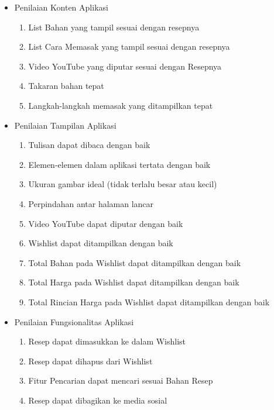 		\begin{itemize}
			\item Penilaian Konten Aplikasi
			\begin{enumerate}
				\item List Bahan yang tampil sesuai dengan resepnya
				\item List Cara Memasak yang tampil sesuai dengan resepnya
				\item Video YouTube yang diputar sesuai dengan Resepnya
				\item Takaran bahan tepat
				\item Langkah-langkah memasak yang ditampilkan tepat
			\end{enumerate}
			\item Penilaian Tampilan Aplikasi
			\begin{enumerate}
				\item Tulisan dapat dibaca dengan baik
				\item Elemen-elemen dalam aplikasi tertata dengan baik
				\item Ukuran gambar ideal (tidak terlalu besar atau kecil)
				\item Perpindahan antar halaman lancar
				\item Video YouTube dapat diputar dengan baik
				\item Wishlist dapat ditampilkan dengan baik
				\item Total Bahan pada Wishlist dapat ditampilkan dengan baik
				\item Total Harga pada Wishlist dapat ditampilkan dengan baik
				\item Total Rincian Harga pada Wishlist dapat ditampilkan dengan baik
			\end{enumerate}
			\item Penilaian Fungsionalitas Aplikasi
			\begin{enumerate}
				\item Resep dapat dimasukkan ke dalam Wishlist
				\item Resep dapat dihapus dari Wishlist
				\item Fitur Pencarian dapat mencari sesuai Bahan Resep
				\item Resep dapat dibagikan ke media sosial
			\end{enumerate}
		\end{itemize}
	
